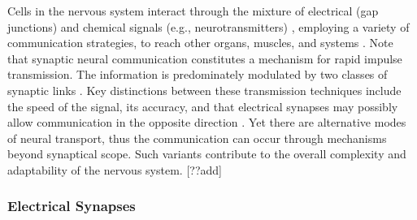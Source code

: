 \documentclass[class={myRUCProject}, crop=false]{standalone}
\begin{document}
Cells in the nervous system interact through the mixture of electrical (gap junctions) and chemical signals (e.g., neurotransmitters) \cite{lovinger2008communication}, employing a variety of communication strategies, to reach other organs, muscles, and systems \cite{SHOYKHET2011783}. Note that synaptic neural communication constitutes a mechanism for rapid impulse transmission. The information is predominately modulated by two classes of synaptic links \cite{SZCZUPAK201699}. Key distinctions between these transmission techniques include the speed of the signal, its accuracy, and that electrical synapses may possibly allow communication in the opposite direction \cite{SZCZUPAK201699}. Yet there are alternative modes of neural transport, thus the communication can occur through mechanisms beyond synaptical scope. Such variants contribute to the overall complexity and adaptability of the nervous system. [??add] 


\subsubsection*{Electrical Synapses}
\end{document}
